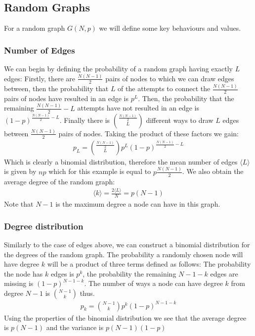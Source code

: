 \documentclass{article}
\begin{document}
        \subsection{Random Graphs}
        For a random graph $G(N,p)$ we will define some key behaviours and values.
            \subsubsection{Number of Edges}
            We can begin by defining the probability of a random graph having exactly $L$ edges:
            Firstly, there are $\frac{N(N-1)}{2}$ pairs of nodes to which we can draw edges between, then the probability that $L$ of the attempts to connect the $\frac{N(N-1)}{2}$ pairs of nodes have resulted in an edge is $p^L$. Then, the probability that the remaining  $\frac{N(N-1)}{2} -L$ attempts have not resulted in an edge is $(1-p)^{\frac{N(N-1)}{2} -L}$. Finally there is $\binom{\frac{N(N-1)}{2}}{L}$ different ways to draw $L$ edges between $\frac{N(N-1)}{2}$ pairs of nodes. Taking the product of these factors we gain:
            \begin{align*}
                p_{L} = \binom{\frac{N(N-1)}{2}}{L}p^L(1-p)^{\frac{N(N-1)}{2} -L}
            \end{align*}
            Which is clearly a binomial distribution, therefore the mean number of edges $\langle L \rangle$ is given by $np$ which for this example is equal to $p\frac{N(N-1)}{2}$. We also obtain the average degree of the random graph:
            \begin{align*}
                \langle k \rangle = \frac{2 \langle L \rangle}{N} = p(N-1)
            \end{align*}
            Note that $N-1$ is the maximum degree a node can have in this graph.
            \subsubsection{Degree distribution}
            Similarly to the case of edges above, we can construct a binomial distribution for the degrees of the random graph. The probability a randomly chosen node will have degree $k$ will be a product of three terms defined as follows: The probability the node has $k$ edges is $p^k$, the probability the remaining $N-1-k$ edges are missing is $(1-p)^{N-1-k}$. The number of ways a node can have degree $k$ from degree $N-1$ is $\binom{N-1}{k}$ thus.
            \begin{align*}
                p_{k} = \binom{N-1}{k}p^k(1-p)^{N-1-k}
            \end{align*}  
            Using the properties of the binomial distribution we see that the average degree is $p(N-1)$ and the variance is $p(N-1)(1-p)$
\end{document}
